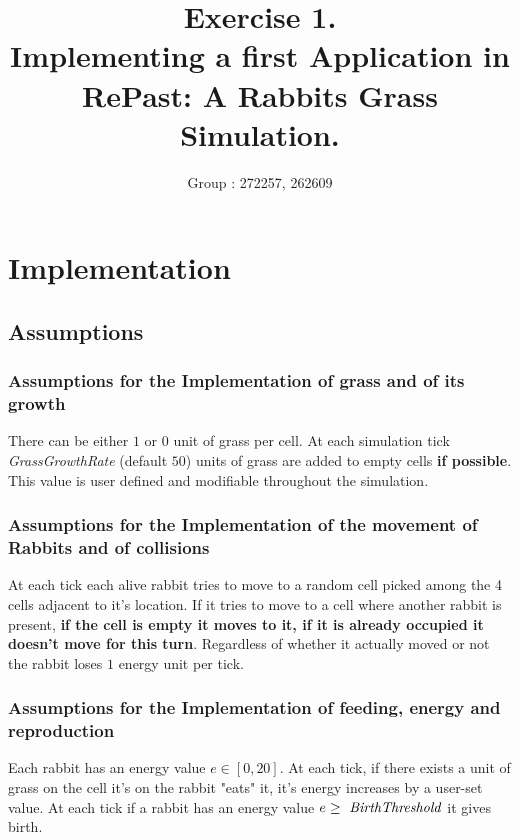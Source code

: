 \documentclass[11pt]{article}
\title{\bf Exercise 1.\\ Implementing a first Application in RePast: A Rabbits Grass Simulation.}
\author{Group \textnumero: 272257, 262609}
\begin{document}
\maketitle

\section{Implementation}


\subsection{Assumptions}

\subsubsection{Assumptions for the Implementation of grass and of its growth}

There can be either $1$ or $0$ unit of grass per cell. At each simulation tick \textit{GrassGrowthRate} (default $50$) units of grass are added to empty cells \textbf{if possible}. This value is user defined and modifiable throughout the simulation.

\subsubsection{Assumptions for the Implementation of the movement of Rabbits and of collisions}

At each tick each alive rabbit tries to move to a random cell picked among the 4 cells adjacent to it's location. If it tries to move to a cell where another rabbit is present, \textbf{if the cell is empty it moves to it, if it is already occupied it doesn't move for this turn}. Regardless of whether it actually moved or not the rabbit loses $1$ energy unit per tick.

\subsubsection{Assumptions for the Implementation of feeding, energy and reproduction}

Each rabbit has an energy value $e \in [0,20]$. At each tick, if there exists a unit of grass on the cell it's on the rabbit "eats" it, it's energy increases by a user-set value. At each tick if a rabbit has an energy value $e \geq \text{ \textit{BirthThreshold}}$ it gives birth.
\end{document}
